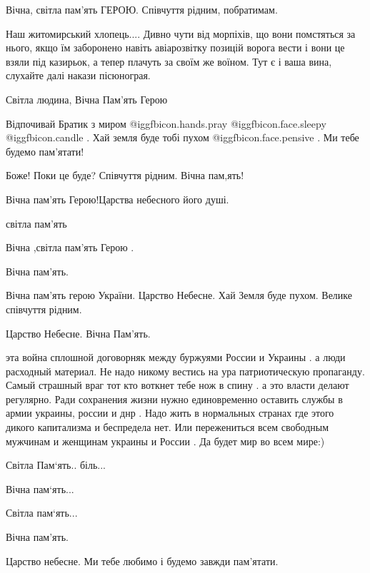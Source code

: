 \begin{itemize}
Вічна, світла пам'ять ГЕРОЮ. Співчуття рідним, побратимам.


Наш житомирський хлопець.... Дивно чути від морпіхів, що вони помстяться за
нього, якщо їм заборонено навіть авіарозвітку позицій ворога вести і вони це
взяли під казирьок, а тепер плачуть за своїм же воїном. Тут є і ваша вина,
слухайте далі накази пісюнограя.


Світла людина, Вічна Пам'ять Герою


Відпочивай Братик з миром @igg{fbicon.hands.pray}  @igg{fbicon.face.sleepy}  @igg{fbicon.candle} . Хай
земля буде тобі пухом @igg{fbicon.face.pensive} . Ми тебе будемо пам'ятати!

Боже! Поки це буде? Співчуття рідним. Вічна пам,ять!

Вічна пам'ять Герою!Царства небесного його душі.

світла пам'ять

Вічна ,світла пам'ять Герою .

Вічна пам'ять.

Вічна пам'ять герою України. Царство Небесне. Хай Земля буде пухом. Велике співчуття рідним.

Царство Небесне. Вічна Пам'ять.


эта война сплошной договорняк между буржуями России и Украины . а люди
расходный материал. Не надо никому вестись на ура патриотическую пропаганду.
Самый страшный враг тот кто воткнет тебе нож в спину . а это власти делают
регулярно. Ради сохранения жизни нужно единовременно оставить службы в армии
украины, россии и днр . Надо жить в нормальных странах где этого дикого
капитализма и беспредела нет. Или пережениться всем свободным мужчинам и
женщинам украины и России . Да будет мир во всем мире:)


Світла Пам‘ять.. біль...

Вічна пам‘ять...

Світла пам‘ять...

Вічна пам'ять.

Царство небесне. Ми тебе любимо і будемо завжди пам'ятати.


\end{itemize}
